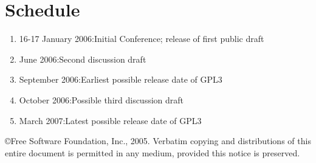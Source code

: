 \appendix
\chapter{Schedule}


\begin{enumerate}


\item 16-17 January 2006:\hfill Initial Conference; release of first public draft	%
\item June 2006:\hfill Second discussion draft
\item September 2006:\hfill Earliest possible release date of GPL3
\item October 2006:\hfill Possible third discussion draft
\item March 2007:\hfill Latest possible release date of GPL3

\end{enumerate}

\vfill \small \copyright Free Software Foundation, Inc., 2005.	%
Verbatim copying and distributions of this entire document
is permitted in any medium, provided this notice is preserved.
